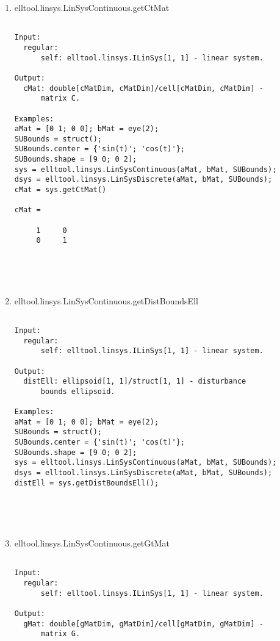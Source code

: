 \begin{enumerate}
\begin{lstlisting}
\end{lstlisting}
\fontfamily{\familydefault}
\selectfont
\item {elltool.linsys.LinSysContinuous.getCtMat}
\selectfont
\begin{lstlisting}

Input:
  regular:
      self: elltool.linsys.ILinSys[1, 1] - linear system.

Output:
  cMat: double[cMatDim, cMatDim]/cell[cMatDim, cMatDim] -
      matrix C.

Examples:
aMat = [0 1; 0 0]; bMat = eye(2);
SUBounds = struct();
SUBounds.center = {'sin(t)'; 'cos(t)'};
SUBounds.shape = [9 0; 0 2];
sys = elltool.linsys.LinSysContinuous(aMat, bMat, SUBounds);
dsys = elltool.linsys.LinSysDiscrete(aMat, bMat, SUBounds);
cMat = sys.getCtMat()

cMat =

     1     0
     0     1





\end{lstlisting}
\fontfamily{\familydefault}
\selectfont
\item {elltool.linsys.LinSysContinuous.getDistBoundsEll}
\selectfont
\begin{lstlisting}

Input:
  regular:
      self: elltool.linsys.ILinSys[1, 1] - linear system.

Output:
  distEll: ellipsoid[1, 1]/struct[1, 1] - disturbance
      bounds ellipsoid.

Examples:
aMat = [0 1; 0 0]; bMat = eye(2);
SUBounds = struct();
SUBounds.center = {'sin(t)'; 'cos(t)'};
SUBounds.shape = [9 0; 0 2];
sys = elltool.linsys.LinSysContinuous(aMat, bMat, SUBounds);
dsys = elltool.linsys.LinSysDiscrete(aMat, bMat, SUBounds);
distEll = sys.getDistBoundsEll();





\end{lstlisting}
\fontfamily{\familydefault}
\selectfont
\item {elltool.linsys.LinSysContinuous.getGtMat}
\selectfont
\begin{lstlisting}

Input:
  regular:
      self: elltool.linsys.ILinSys[1, 1] - linear system.

Output:
  gMat: double[gMatDim, gMatDim]/cell[gMatDim, gMatDim] -
      matrix G.


\end{lstlisting}
\end{enumerate}
